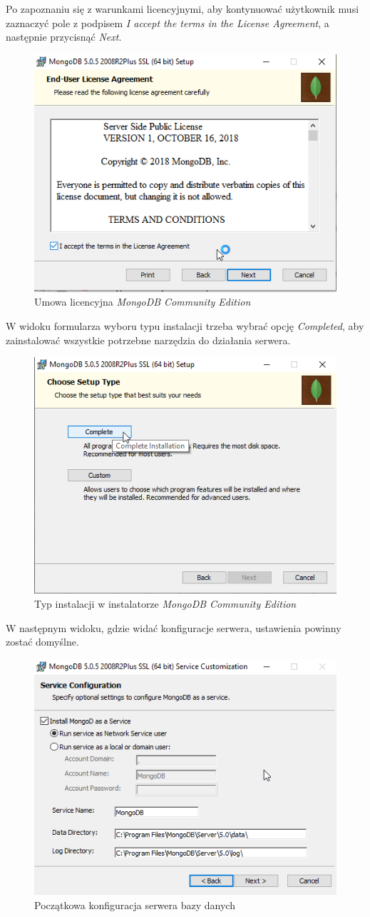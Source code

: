 \documentclass[a4paper,twoside,12pt]{book}
\begin{document}
Po zapoznaniu się z warunkami licencyjnymi, aby kontynuować użytkownik musi zaznaczyć pole z podpisem \textit{I accept the terms in the License Agreement}, a następnie przycisnąć \textit{Next}.
\FloatBarrier
\begin{figure}[H]
	\centering
	\includegraphics[width=0.5\linewidth]{../zrzuty_ekranu/instalcja_mongodb/mongodb2}
	\caption{Umowa licencyjna \textit{MongoDB Community Edition}}
	\label{fig:mongodb2}
\end{figure}
\afterpage{\clearpage}
\FloatBarrier

W widoku formularza wyboru typu instalacji trzeba wybrać opcję \textit{Completed}, aby zainstalować wszystkie potrzebne narzędzia do działania serwera.
\FloatBarrier
\begin{figure}[H]
	\centering
	\includegraphics[width=0.5\linewidth]{../zrzuty_ekranu/instalcja_mongodb/mongodb3}
	\caption{Typ instalacji w instalatorze \textit{MongoDB Community Edition}}
	\label{fig:mongodb3}
\end{figure}
\afterpage{\clearpage}
\FloatBarrier

W następnym widoku, gdzie widać konfiguracje serwera, ustawienia powinny zostać domyślne.
\FloatBarrier
\begin{figure}[H]
	\centering
	\includegraphics[width=0.5\linewidth]{../zrzuty_ekranu/instalcja_mongodb/mongodb4}
	\caption{Początkowa konfiguracja serwera bazy danych}
	\label{fig:mongodb4}
\end{figure}
\afterpage{\clearpage}
\FloatBarrier
\end{document}
